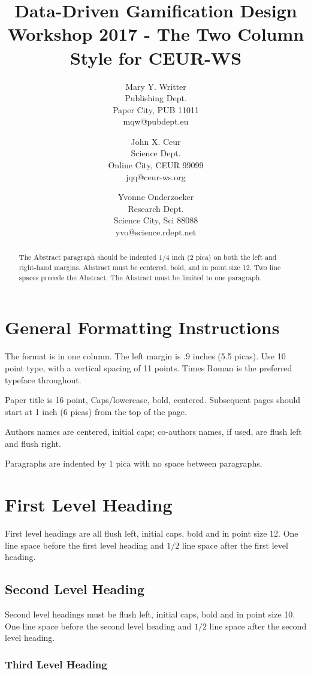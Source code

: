 \documentclass[a4paper]{article}
\title{Data-Driven Gamification Design Workshop 2017 - The Two Column Style for CEUR-WS}
\author{
Mary Y. Writter \\ Publishing Dept.\\
                Paper City, PUB 11011 \\ mqw@pubdept.eu
\and
John X. Ceur \\ Science Dept.\\
                Online City, CEUR 99099 \\ jqq@ceur-ws.org
\and
Yvonne Onderzoeker \\ Research Dept.\\
                Science City, Sci 88088 \\ yvo@science.rdept.net
}
\begin{document}
\maketitle

\begin{abstract}
The Abstract paragraph should be indented $1/4$ inch (2 pica) on both
the left and right-hand margins. Abstract must be centered, bold, and
in point size 12. Two line spaces precede the Abstract. The Abstract
must be limited to one paragraph.
\end{abstract}


\section{General Formatting Instructions}

The format is in one column. The left margin is .9 inches (5.5 picas). Use 10 point type,
with a vertical spacing of 11 points. Times Roman is the preferred
typeface throughout.

Paper title is 16 point, Caps/lowercase, bold, centered. Subsequent
pages should start at 1 inch (6 picas) from the top of the page.

Authors names are centered, initial caps; co-authors names, if used, are
flush left and flush right.

Paragraphs are indented by 1 pica with no space between paragraphs.

\section{First Level Heading}

First level headings are all flush left, initial caps, bold and in point
size 12. One line space before the first level heading and $1/2$ line
space after the first level heading.

\subsection{Second Level Heading}

Second level headings must be flush left, initial caps, bold and in point
size 10. One line space before the second level heading and $1/2$ line
space after the second level heading.

\subsubsection{Third Level Heading}
\end{document}
